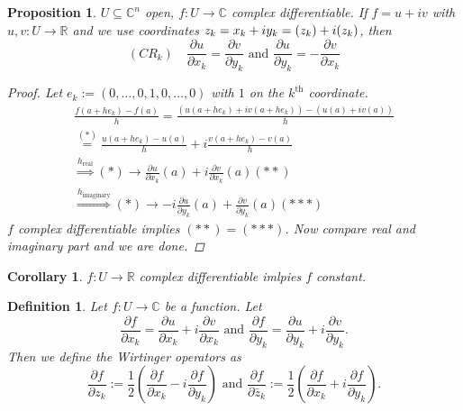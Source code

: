 \documentclass[12pt]{article}
\theoremstyle{darkgreentheorem}
\newtheorem{prop}[thm]{Proposition}
\newtheorem{cor}[thm]{Corollary}
\theoremstyle{darkbluedefinition}
\newtheorem{defn}[thm]{Definition}
\theoremstyle{darkredexample}
\theoremstyle{remark}
\newcommand{\R}{\mathbb{R}}
\newcommand{\1}{\mathbbm{1}}
\newcommand{\C}{\mathbb{C}}
\let\Re\relax
\DeclareMathOperator{\Re}{Re}
\let\Im\relax
\DeclareMathOperator{\Im}{Im}
\begin{document}
\begin{prop}
    $U\subseteq \C^{n}$ open, $f\colon U\to \C$ complex differentiable.
    If $f=u+iv$ with $u,v\colon U\to \R$ and we use coordinates $z_{k}=x_{k}+iy_{k}=\Re(z_{k})+i\Im(z_{k})$, then
    \[ (CR_{k}) \quad \frac{\partial u}{\partial x_{k}}=\frac{\partial v}{\partial y_{k}} \text{ and } \frac{\partial u}{\partial y_{k}}=-\frac{\partial v}{\partial x_{k}} \]
    \begin{proof}
	Let $e_{k}:=(0,\ldots,0,1,0,\ldots,0)$ with $1$ on the $k^{\mathrm{th}}$ coordinate.
	\begin{multline*}
	    \frac{f(a+he_{k})-f(a)}{h}=\frac{(u(a+he_{k})+iv(a+he_{k}))-(u(a)+iv(a))}{h} \\
	    \overset{(*)}{=} \frac{u(a+he_{k})-u(a)}{h} + i\frac{v(a+he_{k})-v(a)}{h} \\
	    \overset{h_{\mathrm{real}}}{\Rightarrow } (*)\to \frac{\partial u}{\partial x_{k}}(a)+i\frac{\partial v}{\partial x_{k}}(a) (**) \\
	    \overset{h_{\mathrm{imaginary}}}{\Rightarrow } (*)\to -i\frac{\partial u}{\partial y_{k}}(a)+\frac{\partial v}{\partial y_{k}}(a) (***)
	\end{multline*}
	$f$ complex differentiable implies $(**)=(***)$.
	Now compare real and imaginary part and we are done.
    \end{proof}
\end{prop}

\begin{cor}
    $f\colon U\to \R$ complex differentiable imlpies $f$ constant.
\end{cor}

\begin{defn}
    Let $f\colon U\to \C$ be a function.
    Let
    \[ \frac{\partial f}{\partial x_{k}}=\frac{\partial u}{\partial x_{k}} + i\frac{\partial v}{\partial x_{k}} \text{ and } \frac{\partial f}{\partial y_{k}}=\frac{\partial u}{\partial y_{k}}+i\frac{\partial v}{\partial y_{k}}. \]
    Then we define the \textit{Wirtinger operators} as
    \[ \frac{\partial f}{\partial z_{k}}:=\frac{1}{2}\left( \frac{\partial f}{\partial x_{k}}-i\frac{\partial f}{\partial y_{k}} \right) \text{ and } \frac{\partial f}{\partial \bar{z}_{k}}:=\frac{1}{2}\left( \frac{\partial f}{\partial x_{k}}+i\frac{\partial f}{\partial y_{k}}\right).\]
\end{defn}
\end{document}

